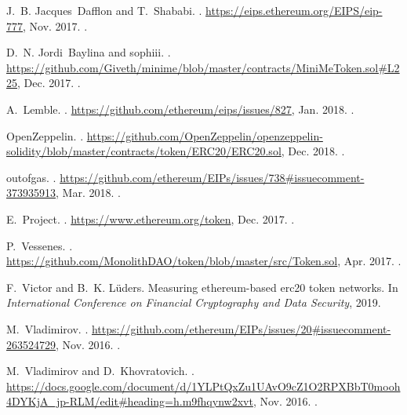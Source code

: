 \begin{thebibliography}{10}
J.~B. Jacques~Dafflon and T.~Shababi.
.
\newblock \url{https://eips.ethereum.org/EIPS/eip-777}, Nov. 2017.
.

D.~N. Jordi~Baylina and sophiii.
.
\newblock
  \url{https://github.com/Giveth/minime/blob/master/contracts/MiniMeToken.sol\#L225},
  Dec. 2017.
.

A.~Lemble.
.
\newblock \url{https://github.com/ethereum/eips/issues/827}, Jan. 2018.
.

OpenZeppelin.
.
\newblock
  \url{https://github.com/OpenZeppelin/openzeppelin-solidity/blob/master/contracts/token/ERC20/ERC20.sol},
  Dec. 2018.
.

outofgas.
.
\newblock
  \url{https://github.com/ethereum/EIPs/issues/738\#issuecomment-373935913},
  Mar. 2018.
.

E.~Project.
.
\newblock \url{https://www.ethereum.org/token}, Dec. 2017.
.

P.~Vessenes.
.
\newblock \url{https://github.com/MonolithDAO/token/blob/master/src/Token.sol},
  Apr. 2017.
.

F.~Victor and B.~K. L{\"u}ders.
\newblock Measuring ethereum-based erc20 token networks.
\newblock In {\em International Conference on Financial Cryptography and Data
  Security}, 2019.

M.~Vladimirov.
.
\newblock
  \url{https://github.com/ethereum/EIPs/issues/20\#issuecomment-263524729},
  Nov. 2016.
.

M.~Vladimirov and D.~Khovratovich.
.
\newblock
  \url{https://docs.google.com/document/d/1YLPtQxZu1UAvO9cZ1O2RPXBbT0mooh4DYKjA_jp-RLM/edit#heading=h.m9fhqynw2xvt},
  Nov. 2016.
.


\end{thebibliography}
